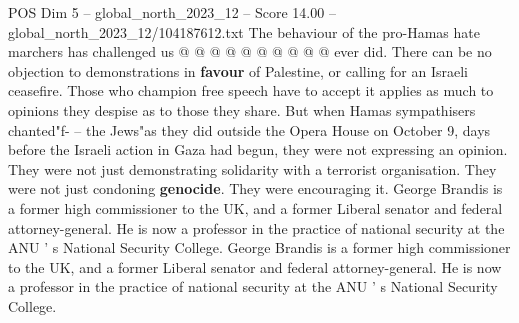 \begin{textsample}{POS Dim 5 – global\_north\_2023\_12 – Score 14.00 – global\_north\_2023\_12/104187612.txt}
The behaviour of the pro-Hamas hate marchers has challenged us @ @ @ @ @ @ @ @ @ @ ever did.
There can be no objection to demonstrations in \textbf{favour} of Palestine, or calling for an Israeli ceasefire.
Those who champion free speech have to accept it applies as much to opinions they despise as to those they share.
But when Hamas sympathisers chanted"f- -- the Jews"as they did outside the Opera House on October 9, days before the Israeli action in Gaza had begun, they were not expressing an opinion.
They were not just demonstrating solidarity with a terrorist organisation.
They were not just condoning \textbf{genocide}.
They were encouraging it.
George Brandis is a former high commissioner to the UK, and a former Liberal senator and federal attorney-general.
He is now a professor in the practice of national security at the ANU ' s National Security College.
George Brandis is a former high commissioner to the UK, and a former Liberal senator and federal attorney-general.
He is now a professor in the practice of national security at the ANU ' s National Security College.

\end{textsample}
